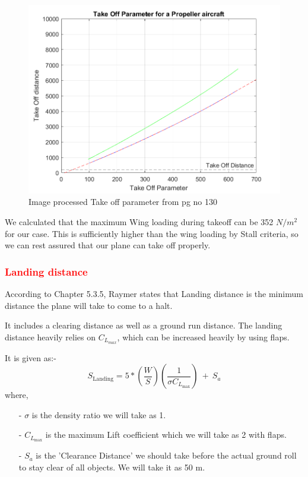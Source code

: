 \documentclass[12 pt]{article}
\begin{document}
\begin{figure}[h]
    \centering
    \includegraphics[width=0.8\linewidth]{Codes/Week 2/Takeoffparam.png}
    \caption{Image processed Take off parameter from \protect\cite{Raymer2006} pg no 130}
    \label{Image processed Take off parameter}
\end{figure}


We calculated that the maximum Wing loading during takeoff can be 352 $N/m^2$ for our case. This is sufficiently higher than the wing loading by Stall criteria, so we can rest assured that our plane can take off properly.

\subsubsection{\textcolor{red}{Landing distance}}

According to \cite{Raymer2006} Chapter 5.3.5, Raymer states that Landing distance is the minimum distance the plane will take to come to a halt.

It includes a clearing distance as well as a ground run distance. The landing distance heavily relies on $C_{L_{max}}$, which can be increased heavily by using flaps.

It is given as:- 
$$ S_{\text{Landing}} = 5*\left( \frac{W}{S} \right) \left( \frac{1}{\sigma C_{L_{\text{max}}}} \right) \: + \: S_a$$
where,
\begin{itemize}
    \item [-] $\sigma$ is the density ratio we will take as 1.
    \item[-] $C_{L_{\text{max}}} $ is the maximum Lift coefficient which we will take as 2 with flaps.
    \item[-] $S_a$ is the 'Clearance Distance' we should take before the actual ground roll to stay clear of all objects. We will take it as 50 m.
\end{itemize}
\end{document}
